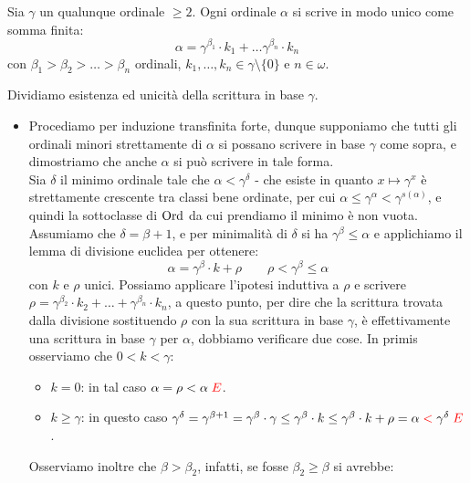 \begin{exercise}
	Sia $\gamma$ un qualunque ordinale $\geq 2$. Ogni ordinale $\alpha$ si scrive in modo unico come somma finita:
	\[ \alpha = \gamma^{\beta_1}\cdot k_1 + \ldots \gamma^{\beta_n}\cdot k_n
		\]
	con $\beta_1 > \beta_2 > \ldots > \beta_n$ ordinali, $k_1,\ldots,k_n \in \gamma\setminus\{0\}$ e $n \in \omega$.
\end{exercise}

\begin{soln}
	Dividiamo esistenza ed unicit\`a della scrittura in base $\gamma$.
	\begin{itemize}
		\item[$\boxed{\text{esistenza}}$] Procediamo per induzione transfinita forte, dunque supponiamo che tutti gli ordinali minori strettamente di $\alpha$ si possano scrivere in base $\gamma$ come sopra, e dimostriamo che anche $\alpha$ si pu\`o scrivere in tale forma.\\
		Sia $\delta$ il minimo ordinale tale che $\alpha < \gamma^\delta$ - che esiste in quanto $x \mapsto \gamma^x$ \`e strettamente crescente tra classi bene ordinate, per cui $\alpha \leq \gamma^\alpha < \gamma^{s(\alpha)}$, e quindi la sottoclasse di $\operatorname{Ord}$ da cui prendiamo il minimo \`e non vuota.
		Assumiamo che $\delta = \beta + 1$, e per minimalit\`a di $\delta$ si ha $\gamma^\beta \leq \alpha$ e applichiamo il lemma di divisione euclidea per ottenere:
		\[ \alpha = \gamma^\beta \cdot k + \rho \qquad \rho < \gamma^\beta \leq \alpha
			\]
		con $k$ e $\rho$ unici. Possiamo applicare l'ipotesi induttiva a $\rho$ e scrivere $\rho = \gamma^{\beta_2}\cdot k_2 + \ldots + \gamma^{\beta_n} \cdot k_n$, a questo punto, per dire che la scrittura trovata dalla divisione sostituendo $\rho$ con la sua scrittura in base $\gamma$,
		\`e effettivamente una scrittura in base $\gamma$ per $\alpha$, dobbiamo verificare due cose. In primis osserviamo che $0 < k < \gamma$:
		\begin{itemize}
			\item \underline{$k = 0$}: in tal caso $\alpha = \rho < \alpha \; \textcolor{red}\lightning$.
			\item \underline{$k \geq \gamma$}: in questo caso $\gamma^\delta = \gamma^{\beta + 1} = \gamma^\beta \cdot \gamma \leq \gamma^\beta \cdot k \leq \gamma^\beta \cdot k + \rho = \alpha \;\textcolor{red}<\; \gamma^\delta \; \textcolor{red}\lightning$. 
		\end{itemize}
		Osserviamo inoltre che $\beta > \beta_2$, infatti, se fosse $\beta_2 \geq \beta$ si avrebbe:

\end{itemize}
\end{soln}
